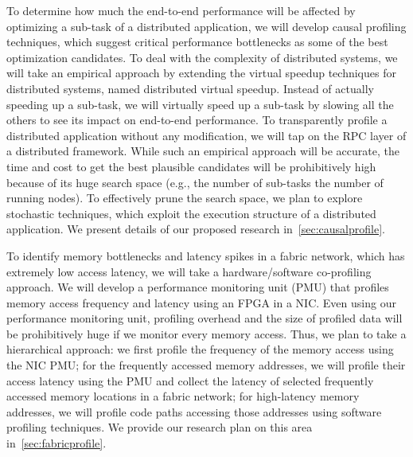 To determine how much the end-to-end performance will be affected by
optimizing a sub-task of a distributed application,
we will develop causal profiling techniques,
which suggest critical performance bottlenecks as some of the best
optimization candidates. To deal with the complexity of distributed
systems, we will take an empirical approach by extending the virtual
speedup techniques for distributed systems,
named distributed virtual speedup. Instead of actually
speeding up a sub-task, we will virtually speed up a sub-task by
slowing all the others to see its impact on end-to-end
performance. To transparently profile a distributed application
without any modification, we will tap on the RPC layer of a
distributed framework. While such an empirical approach will be accurate,
the time and cost to get the best plausible candidates will be
prohibitively high because of its huge search space (e.g., the number of
sub-tasks \x the number of running nodes). To effectively prune the
search space, we plan to explore stochastic techniques, which exploit
the execution structure of a distributed application. We present
details of our proposed research in~\autoref{sec:causalprofile}.

To identify memory bottlenecks and latency spikes in a fabric network,
which has extremely low access latency, we will take
a hardware/software co-profiling approach. We will develop
a performance monitoring unit (PMU) that profiles memory access frequency
and latency using an FPGA in a NIC. Even using our performance
monitoring unit, profiling overhead and the size of profiled data will
be prohibitively huge if we monitor every memory access. Thus, we plan
to take a hierarchical approach:
we first profile the frequency of the memory access using the NIC PMU;
for the frequently accessed memory addresses, we will profile their
access latency using the PMU and collect the latency of selected
frequently accessed memory locations in a fabric network;
for high-latency memory addresses, we will profile code paths
accessing those addresses using software profiling techniques. We
provide our research plan on this area in~\autoref{sec:fabricprofile}.


